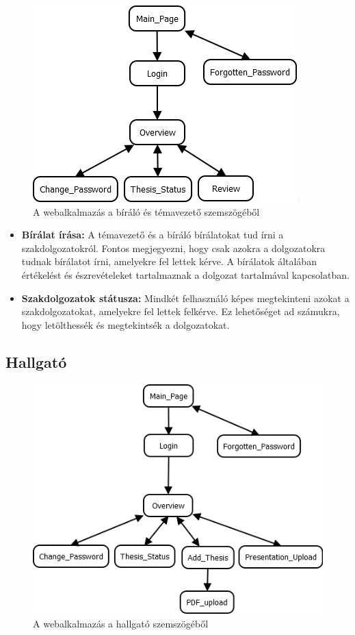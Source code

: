 \begin{figure}[h]
\centering
\includegraphics[scale=0.5]{images/Biralo.png}
\caption{A webalkalmazás a bíráló és témavezető szemszögéből}
\label{fig:biralo_temavezeto}
\end{figure}

\begin{itemize}

\item \textbf{Bírálat írása:} A témavezető és a bíráló bírálatokat tud írni a szakdolgozatokról. Fontos megjegyezni, hogy csak azokra a dolgozatokra tudnak bírálatot írni, amelyekre fel lettek kérve. A bírálatok általában értékelést és észrevételeket tartalmaznak a dolgozat tartalmával kapcsolatban.

\item \textbf{Szakdolgozatok státusza:} Mindkét felhasználó képes megtekinteni azokat a szakdolgozatokat, amelyekre fel lettek felkérve. Ez lehetőséget ad számukra, hogy letölthessék és megtekintsék a dolgozatokat.

\end{itemize}

\subsection{Hallgató}

\begin{figure}[h]
\centering
\includegraphics[scale=0.5]{images/Hallgato.png}
\caption{A webalkalmazás a hallgató szemszögéből}
\label{fig:hallgato}
\end{figure}


